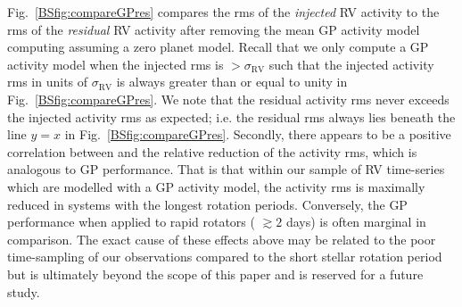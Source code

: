 Fig.~\ref{BSfig:compareGPres} compares the rms of the \emph{injected} RV activity to the rms of the \emph{residual} RV activity
after removing the mean GP activity model computing assuming a zero planet model. Recall that we only compute a GP activity model
when the injected rms is $> \sigma_{\text{RV}}$ such that the injected activity rms in units of $\sigma_{\text{RV}}$
is always greater than or equal to unity in Fig.~\ref{BSfig:compareGPres}.
We note that the residual activity rms never exceeds the injected activity rms as expected; i.e. the residual rms
always lies beneath the line $y=x$ in Fig.~\ref{BSfig:compareGPres}. Secondly,
there appears to be a positive correlation between \prot{} and the relative reduction of the activity rms,
which is analogous to GP performance. That is that within our sample of RV time-series which are modelled with a GP activity
model, the activity rms is maximally reduced in systems
with the longest rotation periods. Conversely, the GP performance when applied to rapid rotators (\prot{} $\gtrsim 2$ days)
is often marginal in comparison. The exact cause of these effects above may be related to the poor time-sampling of our
observations compared to the short stellar rotation period but is ultimately beyond the scope of this paper and is reserved
for a future study. \\

